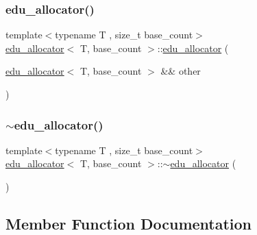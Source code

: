 \mbox{\label{classedu__allocator_a1568fb6d6d3eba994495c6c36c9bd316}} 
\subsubsection{\texorpdfstring{edu\+\_\+allocator()}{edu\_allocator()}\hspace{0.1cm}{\footnotesize\ttfamily [3/3]}}
{\footnotesize\ttfamily template$<$typename T , size\+\_\+t base\+\_\+count$>$ \\
\hyperlink{classedu__allocator}{edu\+\_\+allocator}$<$ T, base\+\_\+count $>$\+::\hyperlink{classedu__allocator}{edu\+\_\+allocator} (\begin{DoxyParamCaption}\item[{\hyperlink{classedu__allocator}{edu\+\_\+allocator}$<$ T, base\+\_\+count $>$ \&\&}]{other }\end{DoxyParamCaption})\hspace{0.3cm}{\ttfamily [delete]}}

\mbox{\label{classedu__allocator_ac7e2dd1dab8e21c3e8d98fc389e1b19f}} 
\subsubsection{\texorpdfstring{$\sim$edu\+\_\+allocator()}{~edu\_allocator()}}
{\footnotesize\ttfamily template$<$typename T , size\+\_\+t base\+\_\+count$>$ \\
\hyperlink{classedu__allocator}{edu\+\_\+allocator}$<$ T, base\+\_\+count $>$\+::$\sim$\hyperlink{classedu__allocator}{edu\+\_\+allocator} (\begin{DoxyParamCaption}{ }\end{DoxyParamCaption})\hspace{0.3cm}{\ttfamily [inline]}}



\subsection{Member Function Documentation}
\mbox{\label{classedu__allocator_a024665ef87c08fb1e9a3fda489ef496e}} 
